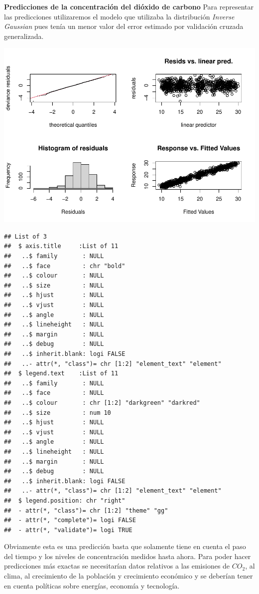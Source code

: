 \documentclass[12pt,a4paper,]{book}
\numberwithin{dummy}{section}
\theoremstyle{ocrenumbox}
\theoremstyle{blacknumex}
\theoremstyle{blacknumbox}
\theoremstyle{ocrenum}
\theoremstyle{ocrenum}
\begin{document}
\textbf{Predicciones de la concentración del dióxido de carbono}
\newline Para representar las predicciones utilizaremos el modelo que
utilizaba la distribución \emph{Inverse Gaussian} pues tenía un menor
valor del error estimado por validación cruzada generalizada.

\begin{center}\includegraphics[width=0.95\linewidth]{figurasR/unnamed-chunk-32-1} \end{center}

\begin{verbatim}
## List of 3
##  $ axis.title     :List of 11
##   ..$ family       : NULL
##   ..$ face         : chr "bold"
##   ..$ colour       : NULL
##   ..$ size         : NULL
##   ..$ hjust        : NULL
##   ..$ vjust        : NULL
##   ..$ angle        : NULL
##   ..$ lineheight   : NULL
##   ..$ margin       : NULL
##   ..$ debug        : NULL
##   ..$ inherit.blank: logi FALSE
##   ..- attr(*, "class")= chr [1:2] "element_text" "element"
##  $ legend.text    :List of 11
##   ..$ family       : NULL
##   ..$ face         : NULL
##   ..$ colour       : chr [1:2] "darkgreen" "darkred"
##   ..$ size         : num 10
##   ..$ hjust        : NULL
##   ..$ vjust        : NULL
##   ..$ angle        : NULL
##   ..$ lineheight   : NULL
##   ..$ margin       : NULL
##   ..$ debug        : NULL
##   ..$ inherit.blank: logi FALSE
##   ..- attr(*, "class")= chr [1:2] "element_text" "element"
##  $ legend.position: chr "right"
##  - attr(*, "class")= chr [1:2] "theme" "gg"
##  - attr(*, "complete")= logi FALSE
##  - attr(*, "validate")= logi TRUE
\end{verbatim}

Obviamente esta es una predicción basta que solamente tiene en cuenta el
paso del tiempo y los niveles de concentración medidos hasta ahora. Para
poder hacer predicciones más exactas se necesitarían datos relativos a
las emisiones de \(CO_2\), al clima, al crecimiento de la población y
crecimiento económico y se deberían tener en cuenta políticas sobre
energías, economía y tecnología.
\end{document}
